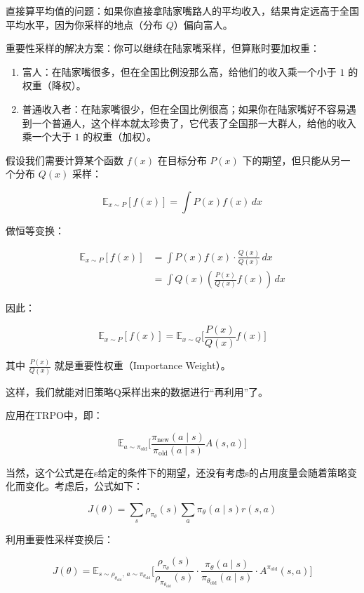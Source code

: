 直接算平均值的问题：如果你直接拿陆家嘴路人的平均收入，结果肯定远高于全国平均水平，因为你采样的地点（分布 \(Q\)）偏向富人。

重要性采样的解决方案：你可以继续在陆家嘴采样，但算账时要加权重：

\begin{enumerate}
\def\labelenumi{\arabic{enumi}.}
\tightlist
\item
  富人：在陆家嘴很多，但在全国比例没那么高，给他们的收入乘一个小于 \(1\) 的权重（降权）。
\item
  普通收入者：在陆家嘴很少，但在全国比例很高；如果你在陆家嘴好不容易遇到一个普通人，这个样本就太珍贵了，它代表了全国那一大群人，给他的收入乘一个大于 \(1\) 的权重（加权）。
\end{enumerate}

假设我们需要计算某个函数 \(f(x)\) 在目标分布 \(P(x)\) 下的期望，但只能从另一个分布 \(Q(x)\) 采样：

\[
\mathbb{E}_{x\sim P}[f(x)] = \int P(x)f(x)\,dx
\]

做恒等变换：

\[
\begin{aligned}
\mathbb{E}_{x\sim P}[f(x)]
&= \int P(x)f(x)\cdot \frac{Q(x)}{Q(x)}\,dx \\
&= \int Q(x)(\frac{P(x)}{Q(x)}f(x))\,dx
\end{aligned}
\]

因此：

\[
\mathbb{E}_{x\sim P}[f(x)]
=
\mathbb{E}_{x\sim Q}
\bigl[
\frac{P(x)}{Q(x)}f(x)
\bigr]
\]

其中 \(\frac{P(x)}{Q(x)}\) 就是重要性权重（Importance Weight）。

这样，我们就能对旧策略Q采样出来的数据进行``再利用''了。

应用在TRPO中，即：

\[
\mathbb{E}_{a\sim\pi_{\mathrm{old}}}
\bigl[
\frac{\pi_{\mathrm{new}}(a\mid s)}{\pi_{\mathrm{old}}(a\mid s)}
A(s,a)
\bigr]
\]

当然，这个公式是在s给定的条件下的期望，还没有考虑s的占用度量会随着策略变化而变化。考虑后，公式如下：

\[
J(\theta)=
\sum_s\rho_{\pi_\theta}(s)
\sum_a\pi_\theta(a\mid s)r(s,a)
\]

利用重要性采样变换后：

\[
J(\theta)=
\mathbb{E}_{s\sim\rho_{\theta_{\mathrm{old}}},\,a\sim\pi_{\theta_{\mathrm{old}}}}
\bigl[
\frac{\rho_{\pi_\theta}(s)}{\rho_{\pi_{\theta_{\mathrm{old}}}}(s)}
\cdot
\frac{\pi_\theta(a\mid s)}{\pi_{\theta_{\mathrm{old}}}(a\mid s)}
\cdot
A^{\pi_{\mathrm{old}}}(s,a)
\bigr]
\]

